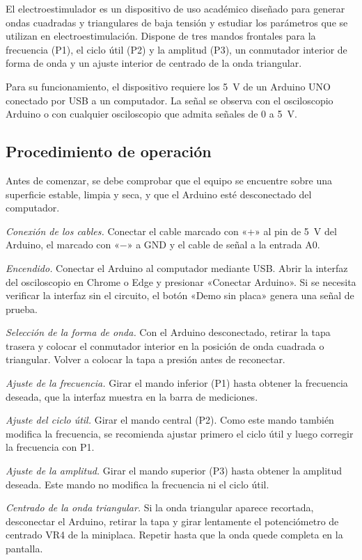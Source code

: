 \documentclass[conference]{IEEEtran}
\begin{document}
El electroestimulador es un dispositivo de uso académico diseñado para generar ondas cuadradas y triangulares de baja tensión y estudiar los parámetros que se utilizan en electroestimulación. Dispone de tres mandos frontales para la frecuencia (P1), el ciclo útil (P2) y la amplitud (P3), un conmutador interior de forma de onda y un ajuste interior de centrado de la onda triangular.

Para su funcionamiento, el dispositivo requiere los 5~V de un Arduino UNO conectado por USB a un computador. La señal se observa con el osciloscopio Arduino o con cualquier osciloscopio que admita señales de 0 a 5~V.

\subsection{Procedimiento de operación}

Antes de comenzar, se debe comprobar que el equipo se encuentre sobre una superficie estable, limpia y seca, y que el Arduino esté desconectado del computador.

\textit{Conexión de los cables.} Conectar el cable marcado con «+» al pin de 5~V del Arduino, el marcado con «$-$» a GND y el cable de señal a la entrada A0.

\textit{Encendido.} Conectar el Arduino al computador mediante USB. Abrir la interfaz del osciloscopio en Chrome o Edge y presionar «Conectar Arduino». Si se necesita verificar la interfaz sin el circuito, el botón «Demo sin placa» genera una señal de prueba.

\textit{Selección de la forma de onda.} Con el Arduino desconectado, retirar la tapa trasera y colocar el conmutador interior en la posición de onda cuadrada o triangular. Volver a colocar la tapa a presión antes de reconectar.

\textit{Ajuste de la frecuencia.} Girar el mando inferior (P1) hasta obtener la frecuencia deseada, que la interfaz muestra en la barra de mediciones.

\textit{Ajuste del ciclo útil.} Girar el mando central (P2). Como este mando también modifica la frecuencia, se recomienda ajustar primero el ciclo útil y luego corregir la frecuencia con P1.

\textit{Ajuste de la amplitud.} Girar el mando superior (P3) hasta obtener la amplitud deseada. Este mando no modifica la frecuencia ni el ciclo útil.

\textit{Centrado de la onda triangular.} Si la onda triangular aparece recortada, desconectar el Arduino, retirar la tapa y girar lentamente el potenciómetro de centrado VR4 de la miniplaca. Repetir hasta que la onda quede completa en la pantalla.
\end{document}
